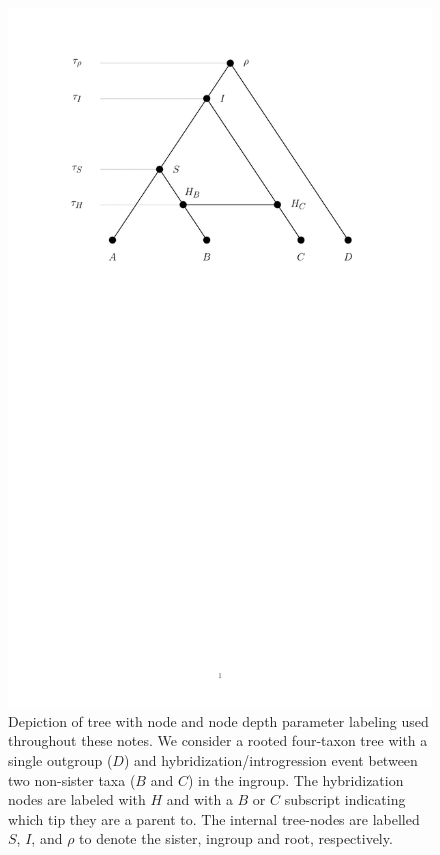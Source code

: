 \documentclass{article}
\begin{document}
\begin{figure}[htp]
\centering
\includegraphics[scale=0.6]{figure1.pdf}
\caption{Depiction of tree with node and node depth parameter labeling used throughout these notes. We consider a rooted four-taxon tree with a single outgroup ($D$) and hybridization/introgression event between two non-sister taxa ($B$ and $C$) in the ingroup. The hybridization nodes are labeled with $H$ and with a $B$ or $C$ subscript indicating which tip they are a parent to. The internal tree-nodes are labelled $S$, $I$, and $\rho$ to denote the sister, ingroup and root, respectively.}
\label{fig:tree}
\end{figure}
\end{document}
